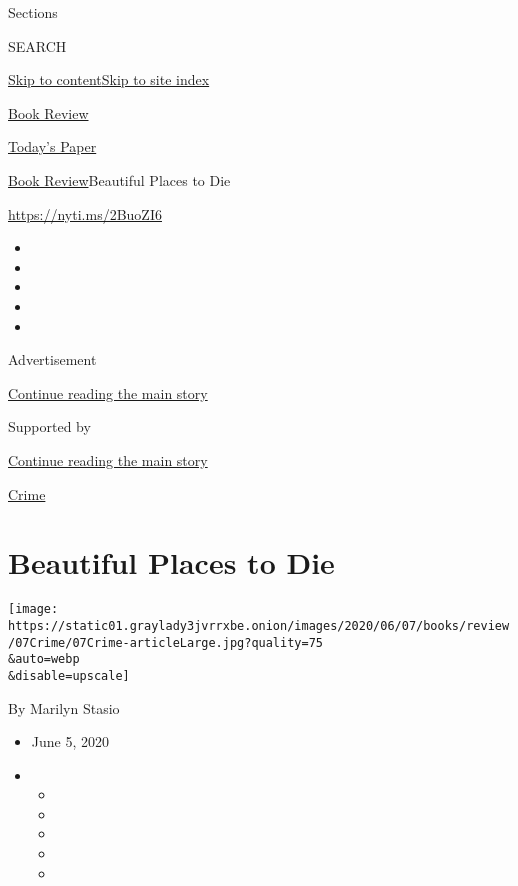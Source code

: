 Sections

SEARCH

\protect\hyperlink{site-content}{Skip to
content}\protect\hyperlink{site-index}{Skip to site index}

\href{https://www.nytimes3xbfgragh.onion/section/books/review}{Book
Review}

\href{https://myaccount.nytimes3xbfgragh.onion/auth/login?response_type=cookie\&client_id=vi}{}

\href{https://www.nytimes3xbfgragh.onion/section/todayspaper}{Today's
Paper}

\href{/section/books/review}{Book Review}\textbar{}Beautiful Places to
Die

\url{https://nyti.ms/2BuoZI6}

\begin{itemize}
\item
\item
\item
\item
\item
\end{itemize}

Advertisement

\protect\hyperlink{after-top}{Continue reading the main story}

Supported by

\protect\hyperlink{after-sponsor}{Continue reading the main story}

\href{/column/crime}{Crime}

\hypertarget{beautiful-places-to-die}{%
\section{Beautiful Places to Die}\label{beautiful-places-to-die}}

\texttt{[image: https://static01.graylady3jvrrxbe.onion/images/2020/06/07/books/review/07Crime/07Crime-articleLarge.jpg?quality=75\\\&auto=webp\\\&disable=upscale]}

By Marilyn Stasio

\begin{itemize}
\item
  June 5, 2020
\item
  \begin{itemize}
  \item
  \item
  \item
  \item
  \item
  \end{itemize}
\end{itemize}

